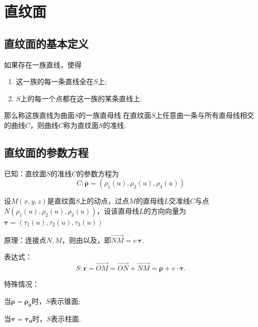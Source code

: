 \section{直纹面}
\subsection{直纹面的基本定义}\label{直纹面的基本定义}
\tdefination[直纹面]

如果存在一族直线，使得
\begin{enumerate}[(1)]
	\setlength{\itemindent}{3em}
	\setlength{\topsep}{0.01em}
	\setlength{\itemsep}{0.01em}
	\item 这一族的每一条直线全在$S$上;
	\item $S$上的每一个点都在这一族的某条直线上.
\end{enumerate}
\par 那么称这族直线为曲面$S$的一族{\color{dy}直母线}.在直纹面$S$上任意曲一条与所有直母线相交的曲线$C$，则曲线$C$称为直纹面$S$的{\color{dy}准线}.
\jg
\subsection{直纹面的参数方程}
\ttheorem[直纹面的向量式方程]

 {\color{dy}已知}：直纹面$S$的准线$C$的参数方程为
\begin{equation*}
C:\bm{\rho}=\left(\rho_1(u),\rho_2(u),\rho_3(u)\right)
\end{equation*}
\par 设$M(x,y,z)$是直纹面$S$上的动点，过点$M$的直母线$L$交准线$C$与点$N\left(\rho_1(u),\rho_2(u),\rho_3(u)\right)$，设该直母线$L$的方向向量为$\bm{\tau}=\left(\tau_1(u),\tau_2(u),\tau_3(u)\right)$
\par {\color{dy}原理}：连接点$N,M$，则由\link[直纹面的基本定义]以及\link[共线定理2]，即$\overrightarrow{NM}=v\,\bm{\tau}$.
\par {\color{dy}表达式}：
\begin{equation}
S:\bm{r}=\overrightarrow{OM}=\overrightarrow{ON}+\overrightarrow{NM}=\bm{\rho}+v \cdot \bm{\tau}.
\label{ZWM.1}
\end{equation}
\par {\color{dy}特殊情况}：
\par \kg \kg 当$\bm{\rho}=\bm{\rho_0}$时，$S$表示锥面;
\par \kg \kg 当$\bm{\tau}=\bm{\tau_0}$时，$S$表示柱面.

